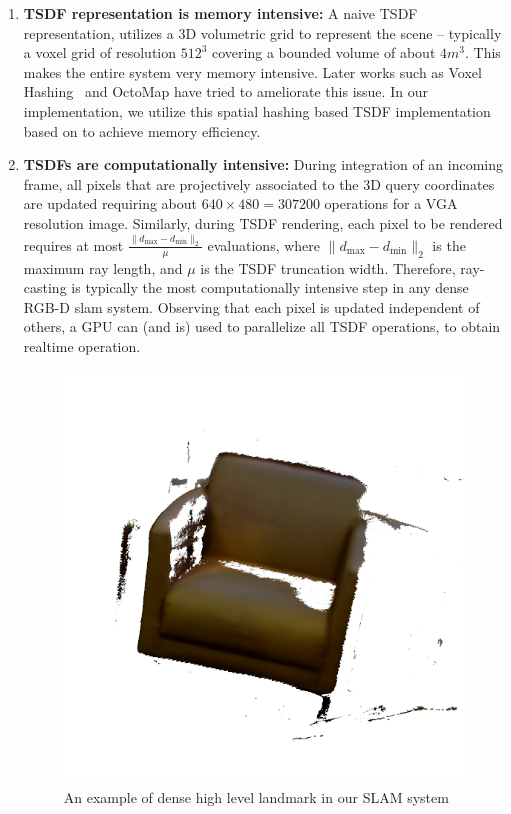 \begin{enumerate}
    \item \textbf{TSDF representation is memory intensive:} A naive TSDF representation, utilizes a 3D volumetric grid to represent the scene -- typically  a voxel grid of resolution $512^3$ covering a bounded volume of about $4m^3$. This makes the entire system very memory intensive. Later works such as Voxel Hashing~\cite{niessnerRealtime3DReconstruction2013} and OctoMap \cite{hornungOctoMapEfficientProbabilistic2013} have tried to ameliorate this issue. In our implementation, we utilize this spatial hashing based TSDF implementation based on \cite{dongGPUAcceleratedRobust2019} to achieve memory efficiency.
    \item \textbf{TSDFs are computationally intensive:} During integration of an incoming frame, all pixels that are projectively associated to the 3D query coordinates are updated requiring about $640\times 480 = 307200$ operations for a VGA resolution image. Similarly, during TSDF rendering, each pixel to be rendered requires at most $\frac{\|d_{\max} - d_{\min}\|_2}{\mu}$ evaluations, where $\|d_{\max} - d_{\min}\|_2$ is the maximum ray length, and $\mu$ is the TSDF truncation width. Therefore, ray-casting is typically the most computationally intensive step in any dense RGB-D slam system. Observing that each pixel is updated independent of others, a GPU can (and is) used to parallelize all TSDF operations, to obtain realtime operation.

\begin{figure}[htpb]
    \centering
    \includegraphics[width=0.4\linewidth]{figs/chair-landmark.png}
    \caption{An example of dense high level landmark in our SLAM system}%
    \label{fig:chair-landmark}
\end{figure}


\end{enumerate}
